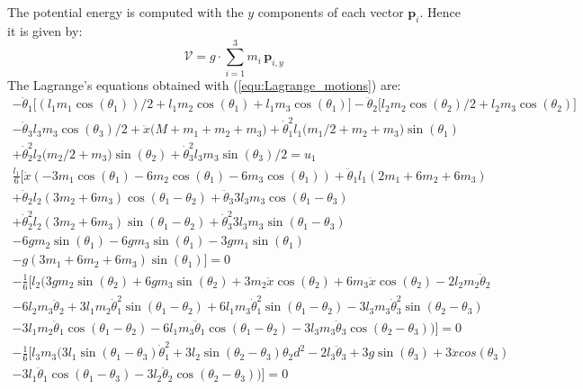 \documentclass[a4paper,12pt]{article}
\begin{document}
The potential energy is computed with the $y$ components of each vector $\mathbf{p}_i$. Hence it is given by:
\begin{equation} \label{equ:potential}
	\mathcal{V} = g \cdot \sum_{i=1}^3 m_i\, \mathbf{p}_{i,y}
\end{equation}
The Lagrange's equations obtained with (\ref{equ:Lagrange_motions}) are:
\begin{multline}
- \ddot\theta_1 \big[(l_1 m_1 \cos( \theta_1))/2 + l_1 m_2 \cos(\theta_1) + l_1 m_3 \cos(\theta_1)\big] - \ddot \theta_2 \big[l_2 m_2 \cos(\theta_2)/2 + l_2 m_3 \cos(\theta_2)\big] \\
- \ddot\theta_3 l_3 m_3 \cos(\theta_3)/2 + \ddot x \big(M + m_1 + m_2 + m_3\big) + \dot\theta_1^2 l_1 \big( m_1/2 + m_2 + m_3 \big)\sin(\theta_1) \\
+ \dot \theta_2^2 l_2\big(m_2/2 + m_3\big)\sin(\theta_2) +\dot \theta_3^2 l_3 m_3 \sin(\theta_3)/2 = u_1
\end{multline}
\begin{multline}
\frac{l_1}{6}\big[\ddot x\left( -3m_1\cos(\theta_1) - 6m_2\cos(\theta_1) - 6m_3\cos(\theta_1) \right) +\ddot\theta_1 l_1\left( 2m_1 + 6m_2 + 6m_3 \right) \\
+ \ddot\theta_2 l_2 \left(3m_2 + 6m_3\right) \cos(\theta_1 - \theta_2) + \ddot\theta_3 3l_3m_3\cos(\theta_1 - \theta_3) \\
+\dot\theta_2^2 l_2 (3m_2 + 6m_3) \sin(\theta_1-\theta_2) + \dot\theta_3^2 3 l_3m_3 \sin(\theta_1-\theta_3)\\
- 6 g m_2 \sin(\theta_1) - 6 g m_3 \sin(\theta_1) - 3 g m_1 \sin(\theta_1)\\
- g (3m_1+6m_2+6m_3) \sin(\theta_1) \big] = 0
\end{multline}
\begin{multline}
-\tfrac{1}{6}\big[l_2 (3 g m_2  \sin(\theta_2) + 6 g m_3  \sin(\theta_2) + 3 m_2 \ddot x  \cos(\theta_2) + 6 m_3 \ddot x  \cos(\theta_2) - 2 l_2 m_2 \ddot \theta_2 \\
- 6 l_2 m_3 \ddot \theta_2 + 3 l_1 m_2 \dot \theta_1^2  \sin(\theta_1 - \theta_2) + 6 l_1 m_3 \dot \theta_1^2  \sin(\theta_1 - \theta_2) - 3 l_3 m_3 \dot \theta_3^2  \sin(\theta_2 - \theta_3) \\
- 3 l_1 m_2 \ddot \theta_1  \cos(\theta_1 - \theta_2) - 6 l_1 m_3 \ddot \theta_1  \cos(\theta_1 - \theta_2) - 3 l_3 m_3 \ddot \theta_3  \cos(\theta_2 - \theta_3))\big] = 0
\end{multline}
\begin{multline}
-\tfrac{1}{6}\big[l_3 m_3 (3 l_1 \sin(\theta_1 - \theta_3) \dot\theta_1^2 + 3 l_2 \sin(\theta_2 - \theta_3) \theta_2d^2 - 2 l_3 \ddot\theta_3 + 3 g \sin(\theta_3) + 3 \ddot x cos(\theta_3) \\
- 3 l_1 \ddot\theta_1 \cos(\theta_1 - \theta_3) - 3 l_2 \ddot\theta_2 \cos(\theta_2 - \theta_3))\big] = 0
\end{multline}
\end{document}
